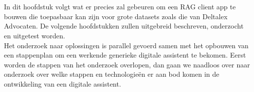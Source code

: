 
\chapter{}%
\label{ch:methodologie}


In dit hoofdstuk volgt wat er precies zal gebeuren om een RAG client app te bouwen die toepasbaar kan zijn voor grote datasets zoals die van Deltalex Advocaten. 
De volgende hoofdstukken zullen uitgebreid beschreven, onderzocht en uitgetest worden. \\

Het onderzoek naar oplossingen is parallel gevoerd samen met het opbouwen van een stappenplan om een werkende generieke digitale assistent te bekomen. 
Eerst worden de stappen van het onderzoek overlopen, dan gaan we naadloos over naar onderzoek over welke stappen en technologieën er aan bod komen in de ontwikkeling van een digitale assistent. 

